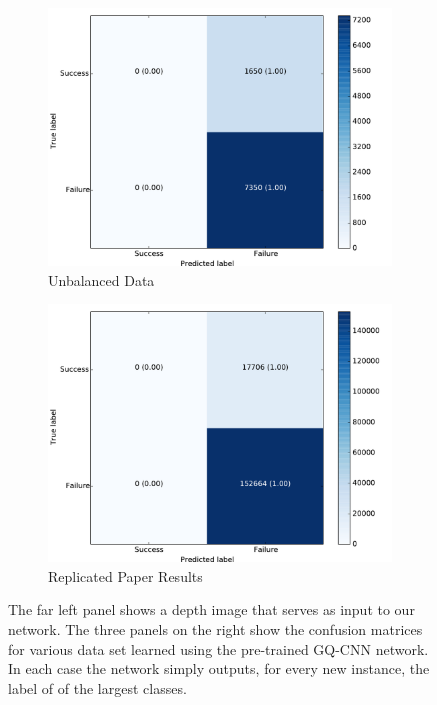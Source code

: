 \begin{figure}[t!]
\begin{subfigure}[t]{0.24\textwidth}
        \includegraphics[width=0.9\columnwidth]{figs/unbalanced_results.pdf} \caption{Unbalanced Data} \label{fig:unbalanced_confusion}
        \end{subfigure}
    \begin{subfigure}[t]{0.24\textwidth}
        \includegraphics[width=0.9\columnwidth]{figs/paper_original.pdf} \caption{Replicated Paper Results} \label{fig:from_paper}
    \end{subfigure}
\caption{The far left panel shows a depth image that serves as input to our network. The three panels on the right show the confusion matrices for various data set learned using the pre-trained GQ-CNN network. In each case the network simply outputs, for every new instance, the label of of the largest classes. } \label{fig:confusion_matrices}
\end{figure}

